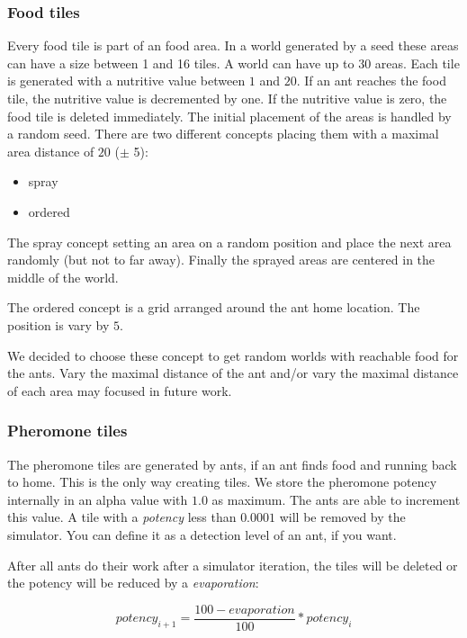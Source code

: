 \subsubsection{Food tiles}\label{food-tiles}

Every food tile is part of an food area. In a world generated by a seed
these areas can have a size between 1 and 16 tiles. A world can have up
to \(30\) areas. Each tile is generated with a nutritive value between
\(1\) and \(20\). If an ant reaches the food tile, the nutritive value
is decremented by one. If the nutritive value is zero, the food tile is
deleted immediately. The initial placement of the areas is handled by a
random seed. There are two different concepts placing them with a
maximal area distance of \(20\) (\(\pm\) 5):

\begin{itemize}
\tightlist
\item
  spray
\item
  ordered
\end{itemize}

The spray concept setting an area on a random position and place the
next area randomly (but not to far away). Finally the sprayed areas are
centered in the middle of the world.

The ordered concept is a grid arranged around the ant home location. The
position is vary by \(5\).

We decided to choose these concept to get random worlds with reachable
food for the ants. Vary the maximal distance of the ant and/or vary the
maximal distance of each area may focused in future work.

\subsubsection{Pheromone tiles}\label{pheromone-tiles}

The pheromone tiles are generated by ants, if an ant finds food and
running back to home. This is the only way creating tiles. We store the
pheromone potency internally in an alpha value with \(1.0\) as maximum.
The ants are able to increment this value. A tile with a \emph{potency}
less than \(0.0001\) will be removed by the simulator. You can define it
as a detection level of an ant, if you want.

After all ants do their work after a simulator iteration, the tiles will
be deleted or the potency will be reduced by a \emph{evaporation}:

\[ potency_{i+1} = \frac{100 - evaporation}{100} * potency_{i} \]

